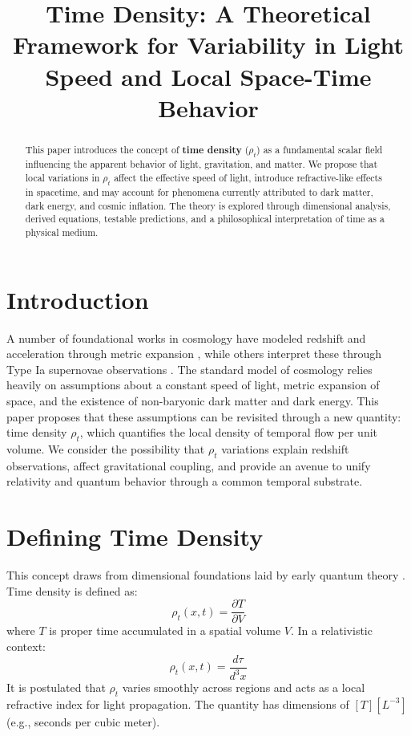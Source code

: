 \documentclass[12pt]{article}
\title{Time Density: A Theoretical Framework for Variability in Light Speed and Local Space-Time Behavior}
\author{}
\date{}
\begin{document}
\maketitle

\begin{abstract}
This paper introduces the concept of \textbf{time density} ($\rho_t$) as a fundamental scalar field influencing the apparent behavior of light, gravitation, and matter. We propose that local variations in $\rho_t$ affect the effective speed of light, introduce refractive-like effects in spacetime, and may account for phenomena currently attributed to dark matter, dark energy, and cosmic inflation. The theory is explored through dimensional analysis, derived equations, testable predictions, and a philosophical interpretation of time as a physical medium.
\end{abstract}

\section{Introduction}
A number of foundational works in cosmology have modeled redshift and acceleration through metric expansion \cite{peebles1993}, while others interpret these through Type Ia supernovae observations \cite{riess1998}.
The standard model of cosmology relies heavily on assumptions about a constant speed of light, metric expansion of space, and the existence of non-baryonic dark matter and dark energy. This paper proposes that these assumptions can be revisited through a new quantity: time density $\rho_t$, which quantifies the local density of temporal flow per unit volume. We consider the possibility that $\rho_t$ variations explain redshift observations, affect gravitational coupling, and provide an avenue to unify relativity and quantum behavior through a common temporal substrate.

\section{Defining Time Density}
This concept draws from dimensional foundations laid by early quantum theory \cite{planck1900}.
Time density is defined as:
\[ \rho_t(x,t) = \frac{\partial T}{\partial V} \]
where $T$ is proper time accumulated in a spatial volume $V$. In a relativistic context:
\[ \rho_t(x,t) = \frac{d\tau}{d^3x} \]
It is postulated that $\rho_t$ varies smoothly across regions and acts as a local refractive index for light propagation. The quantity has dimensions of $[T][L^{-3}]$ (e.g., seconds per cubic meter).
\end{document}
